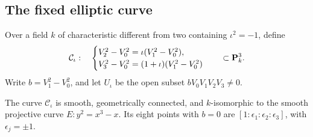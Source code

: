 \subsection{The fixed elliptic curve}

Over a field \(k\) of characteristic different from two containing
\(\iota^2=-1\), define
\begin{equation}\label{crit:curve}
 \mathcal C_\iota:\quad
 \begin{cases}
 V_2^2-V_0^2=\iota(V_1^2-V_0^2),\\
 V_3^2-V_0^2=(1+\iota)(V_1^2-V_0^2)
 \end{cases}
 \quad\subset\mathbf P^3_k.
\end{equation}
Write \(b=V_1^2-V_0^2\), and let \(U_\iota\) be the open subset
\(bV_0V_1V_2V_3\ne0\).

\begin{proposition}\label{prop:crit-elliptic}
The curve \(\mathcal C_\iota\) is smooth, geometrically connected,
and \(k\)-isomorphic to the smooth projective curve
\(E:y^2=x^3-x\). Its eight points with \(b=0\) are
\([1:\epsilon_1:\epsilon_2:\epsilon_3]\), with \(\epsilon_j=\pm1\).
\end{proposition}

